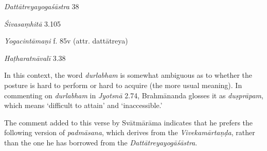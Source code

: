 \begin{ekdosis}
\begin{sources}[hp01_047]
\emph{Dattātreyayogaśāstra} 38

\begin{versinnote}
\end{versinnote}

\emph{Śivasaṃhitā} 3.105

\begin{versinnote}
\end{versinnote}

\end{sources}

\begin{testimonia}[hp01_047]
\emph{Yogacintāmaṇi} f. 85v (attr. dattātreya)

\begin{versinnote}
\end{versinnote}

\emph{Haṭharatnāvalī} 3.38

\begin{versinnote}
\end{versinnote}

\end{testimonia}

\begin{philcomm}[hp01_047]
In this context, the word \emph{durlabham} is somewhat ambiguous as to whether the posture is hard to perform or hard to acquire (the more usual meaning). In commenting on \emph{durlabham} in \emph{Jyotsnā} 2.74, Brahmānanda glosses it as \emph{duṣprāpam}, which means `difficult to attain' and `inaccessible.' 

The comment added to this verse by Svātmārāma indicates that he prefers the following version of \emph{padmāsana}, which derives from the \emph{Vivekamārtaṇḍa}, rather than the one he has borrowed from the \emph{Dattātreyayogāśāstra}. 
\end{philcomm}


\end{ekdosis}
